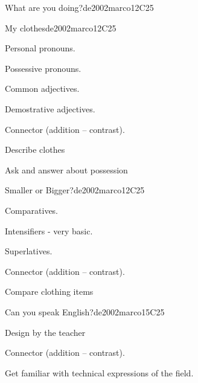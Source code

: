 \begin{syllabus}
\begin{unit}{What are you doing?}{}{de2002marco}{12}{C25}
\end{unit}

\begin{unit}{My clothes}{}{de2002marco}{12}{C25}
   \begin{topics}
      \item Personal pronouns.
      \item Possessive pronouns.
      \item Common adjectives.
      \item Demostrative adjectives.
      \item Connector (addition – contrast).
   \end{topics}

   \begin{learningoutcomes}
      \item Describe clothes
      \item Ask and answer about possession
   \end{learningoutcomes}

\end{unit}

\begin{unit}{Smaller or Bigger?}{}{de2002marco}{12}{C25}
   \begin{topics}
      \item Comparatives.
      \item Intensifiers - very basic.
      \item Superlatives.
      \item Connector (addition – contrast).
   \end{topics}

   \begin{learningoutcomes}
      \item Compare clothing items
   \end{learningoutcomes}
\end{unit}

\begin{unit}{Can you speak English?}{}{de2002marco}{15}{C25}
   \begin{topics}
      \item Design by the teacher
      \item Connector (addition – contrast).
   \end{topics}

   \begin{learningoutcomes}
      \item Get familiar with technical expressions of the field.
   \end{learningoutcomes}
\end{unit}

\begin{coursebibliography}
\end{coursebibliography}
\end{syllabus}
%
